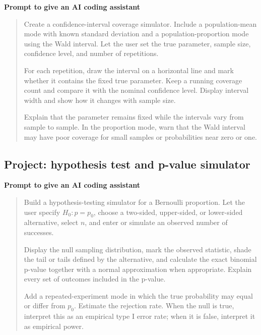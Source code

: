 \begin{examplebox}
\textbf{Prompt to give an AI coding assistant}

\begin{quote}\small
Create a confidence-interval coverage simulator. Include a population-mean mode with known standard deviation and a population-proportion mode using the Wald interval. Let the user set the true parameter, sample size, confidence level, and number of repetitions.

For each repetition, draw the interval on a horizontal line and mark whether it contains the fixed true parameter. Keep a running coverage count and compare it with the nominal confidence level. Display interval width and show how it changes with sample size.

Explain that the parameter remains fixed while the intervals vary from sample to sample. In the proportion mode, warn that the Wald interval may have poor coverage for small samples or probabilities near zero or one.
\end{quote}
\end{examplebox}

\subsection*{Project: hypothesis test and p-value simulator}

\begin{examplebox}
\textbf{Prompt to give an AI coding assistant}

\begin{quote}\small
Build a hypothesis-testing simulator for a Bernoulli proportion. Let the user specify \(H_0:p=p_0\), choose a two-sided, upper-sided, or lower-sided alternative, select \(n\), and enter or simulate an observed number of successes.

Display the null sampling distribution, mark the observed statistic, shade the tail or tails defined by the alternative, and calculate the exact binomial p-value together with a normal approximation when appropriate. Explain every set of outcomes included in the p-value.

Add a repeated-experiment mode in which the true probability may equal or differ from \(p_0\). Estimate the rejection rate. When the null is true, interpret this as an empirical type I error rate; when it is false, interpret it as empirical power.
\end{quote}
\end{examplebox}


